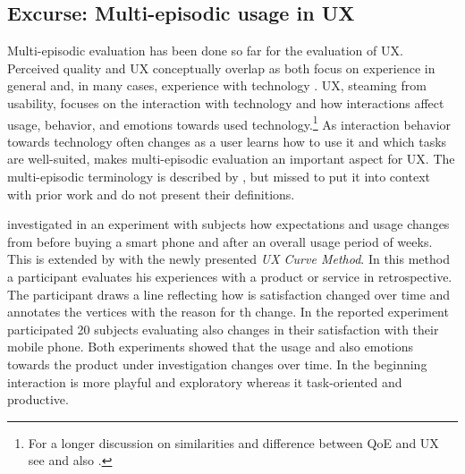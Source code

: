 \subsection{Excurse: Multi-episodic usage in \acl{UX}}
Multi-episodic evaluation has been done so far for the evaluation of \acf{UX}.
Perceived quality and \ac{UX} conceptually overlap as both focus on experience in general and, in many cases, experience with technology \citep[cf.][]{book chap 3}.
\ac{UX}, steaming from usability, focuses on the interaction with technology and how interactions affect usage, behavior, and emotions towards used technology.\footnote{For a longer discussion on similarities and difference between \ac{QoE} and \ac{UX} see \cite{book chapter 3} and also \cite{Hasenzahl 2008: towards user experience}.}
As interaction behavior towards technology often changes as a user learns how to use it and which tasks are well-suited, makes multi-episodic evaluation an important aspect for \ac{UX}.
The multi-episodic terminology is described by \citet[p. 8]{roto_user_2011}, but missed to put it into context with prior work and do not present their definitions.

\cite{karapanos_user_2009} investigated in an experiment with \unit[6]{subjects} how expectations and usage changes from before buying a smart phone and after an overall usage period of \unit[4]{weeks}. %
This is extended by \cite{kujala_ux_2011} with the newly presented \emph{UX Curve Method}.
In this method a participant evaluates his experiences with a product or service in retrospective.
The participant draws a line reflecting how is satisfaction changed over time and annotates the vertices with the reason for th change.
In the reported experiment participated 20 subjects evaluating also changes in their satisfaction with their mobile phone.
Both experiments showed that the usage and also emotions towards the product under investigation changes over time.
In the beginning interaction is more playful and exploratory whereas it task-oriented and productive.





